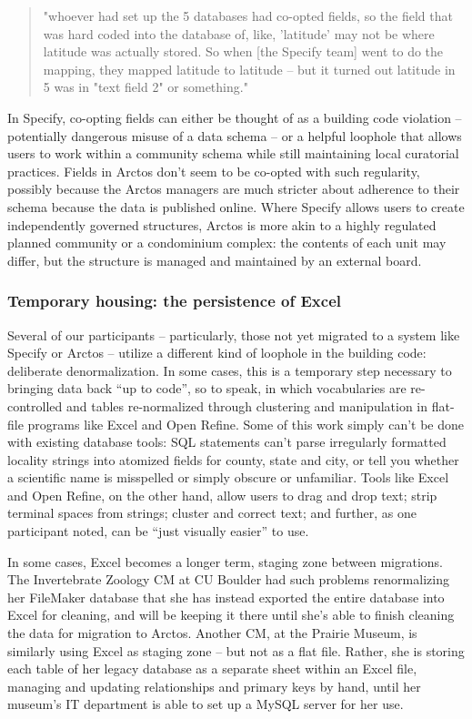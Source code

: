 \begin{quote}
"whoever had set up the 5 databases had co-opted fields, so the field that was hard coded into the database of, like, 'latitude' may not be where latitude was actually stored. So when [the Specify team] went to do the mapping, they mapped latitude to latitude -- but it turned out latitude in 5 was in "text field 2" or something." 
\end{quote}

In Specify, co-opting fields can either be thought of as a building code violation -- potentially dangerous misuse of a data schema -- or a helpful loophole that allows users to work within a community schema while still maintaining local curatorial practices. Fields in Arctos don't seem to be co-opted with such regularity, possibly because the Arctos managers are much stricter about adherence to their schema because the data is published online. Where Specify allows users to create independently governed structures, Arctos is more akin to a highly regulated planned community or a condominium complex: the contents of each unit may differ, but the structure is managed and maintained by an external board.

\subsubsection{Temporary housing: the persistence of Excel}

Several of our participants -- particularly, those not yet migrated to a system like Specify or Arctos -- utilize a different kind of loophole in the building code: deliberate denormalization. In some cases, this is a temporary step necessary to bringing data back “up to code”, so to speak, in which vocabularies are re-controlled and tables re-normalized through clustering and manipulation in flat-file programs like Excel and Open Refine. Some of this work simply can’t be done with existing database tools: SQL statements can’t parse irregularly formatted locality strings into atomized fields for county, state and city, or tell you whether a scientific name is misspelled or simply obscure or unfamiliar. Tools like Excel and Open Refine, on the other hand, allow users to drag and drop text; strip terminal spaces from strings; cluster and correct text; and further, as one participant noted, can be “just visually easier” to use.

In some cases, Excel becomes a longer term, staging zone between migrations. The Invertebrate Zoology CM at CU Boulder had such problems renormalizing her FileMaker database that she has instead exported the entire database into Excel for cleaning, and will be keeping it there until she’s able to finish cleaning the data for migration to Arctos. Another CM, at the Prairie Museum, is similarly using Excel as staging zone – but not as a flat file.  Rather, she is storing each table of her legacy database as a separate sheet within an Excel file, managing and updating relationships and primary keys by hand, until her museum’s IT department is able to set up a MySQL server for her use. 

